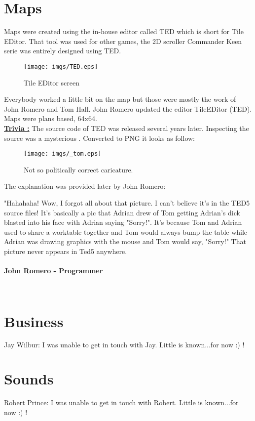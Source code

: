 \documentclass[book.tex]{subfiles}
\begin{document}
\section{Maps}
Maps were created using the in-house editor called TED which is short for Tile EDitor. That tool was used for other games, the 2D scroller Commander Keen serie was entirely designed using TED.\\
\begin{figure}[H]
\centering
 \texttt{[image: imgs/TED.eps]}
 \caption{Tile EDitor screen} \label{fig:mips}
 \end{figure}
 
Everybody worked a little bit on the map but those were mostly the work of John Romero and Tom Hall. John Romero updated the editor TileEDitor (TED). Maps were plans based, 64x64.\\

 \textbf{\underline{Trivia :}} The source code of TED was released several years later. Inspecting the source was a mysterious . Converted to PNG it looks as follow:\\
\begin{figure}[H]
\centering
 \texttt{[image: imgs/\_tom.eps]}
 \caption{Not so politically correct caricature.} \label{fig:mips}
 \end{figure}
The explanation was provided later by John Romero:\\
 \begin{fancyquotes}
   "Hahahaha! Wow, I forgot all about that picture. I can't believe it's 
in the TED5 source files! It's basically a pic that Adrian drew of Tom 
getting Adrian's dick blasted into his face with Adrian saying "Sorry!". 
It's because Tom and Adrian used to share a worktable together and Tom 
would always bump the table while Adrian was drawing graphics with the 
mouse and Tom would say, "Sorry!" That picture never appears in Ted5 
anywhere.\\
   \\
\textbf{John Romero - Programmer}
 \end{fancyquotes}\\



\section{Business}
Jay Wilbur: I was unable to get in touch with Jay. Little is known...for now :) !\\
\section{Sounds}
Robert Prince: I was unable to get in touch with Robert. Little is known...for now :) !\\
\end{document}
